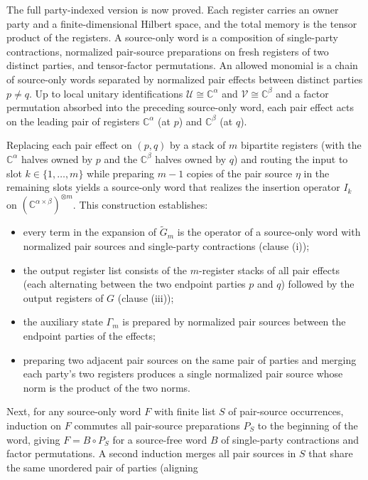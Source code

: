 \documentclass{article}
\begin{document}
The full party-indexed version is now proved. Each register carries an owner
party and a finite-dimensional Hilbert space, and the total memory is the
tensor product of the registers. A source-only word is a composition of
single-party contractions, normalized pair-source preparations on fresh
registers of two distinct parties, and tensor-factor permutations. An allowed
monomial is a chain of source-only words separated by normalized pair effects
between distinct parties $p\ne q$. Up to local unitary identifications
$\mathcal U\cong\mathbb C^\alpha$ and $\mathcal V\cong\mathbb C^\beta$ and a
factor permutation absorbed into the preceding source-only word, each pair
effect acts on the leading pair of registers $\mathbb C^\alpha$ (at $p$) and
$\mathbb C^\beta$ (at $q$).

Replacing each pair effect on $(p,q)$ by a stack of $m$ bipartite registers
(with the $\mathbb C^\alpha$ halves owned by $p$ and the $\mathbb C^\beta$
halves owned by $q$) and routing the input to slot $k\in\{1,\ldots,m\}$ while
preparing $m-1$ copies of the pair source $\eta$ in the remaining slots yields
a source-only word that realizes the insertion operator $I_k$ on
$(\mathbb C^{\alpha\times\beta})^{\otimes m}$. This construction establishes:
\begin{itemize}
\item every term in the expansion of $\widetilde G_m$ is the operator of a
  source-only word with normalized pair sources and single-party contractions
  (clause (i));
\item the output register list consists of the $m$-register stacks of all pair
  effects (each alternating between the two endpoint parties $p$ and $q$)
  followed by the output registers of $G$ (clause (iii));
\item the auxiliary state $\Gamma_m$ is prepared by normalized pair sources
  between the endpoint parties of the effects;
\item preparing two adjacent pair sources on the same pair of parties and
  merging each party's two registers produces a single normalized pair source
  whose norm is the product of the two norms.
\end{itemize}
Next, for any source-only word $F$ with finite list $S$ of pair-source
occurrences, induction on $F$ commutes all pair-source preparations $P_S$ to
the beginning of the word, giving $F=B\circ P_S$ for a source-free word $B$ of
single-party contractions and factor permutations. A second induction merges all
pair sources in $S$ that share the same unordered pair of parties (aligning
\end{document}
